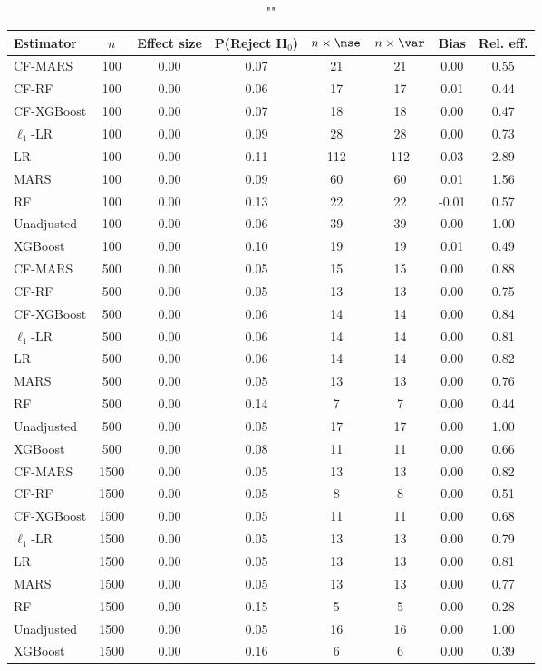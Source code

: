 \begin{table}
\centering
\caption{""}
\begin{tabular}{lccccccc}
\toprule
Estimator & $n$ & Effect size & P(Reject H$_0$) & $n\times\mse$ & $n\times \var$ & Bias & Rel. eff.\\ \midrule
CF-MARS & 100 & 0.00 & 0.07 &  21 &  21 &  0.00 & 0.55 \\ 
CF-RF & 100 & 0.00 & 0.06 &  17 &  17 &  0.01 & 0.44 \\ 
CF-XGBoost & 100 & 0.00 & 0.07 &  18 &  18 &  0.00 & 0.47 \\ 
$\ell_1$-LR & 100 & 0.00 & 0.09 &  28 &  28 &  0.00 & 0.73 \\ 
LR & 100 & 0.00 & 0.11 & 112 & 112 &  0.03 & 2.89 \\ 
MARS & 100 & 0.00 & 0.09 &  60 &  60 &  0.01 & 1.56 \\ 
RF & 100 & 0.00 & 0.13 &  22 &  22 & -0.01 & 0.57 \\ 
Unadjusted & 100 & 0.00 & 0.06 &  39 &  39 &  0.00 & 1.00 \\ 
XGBoost & 100 & 0.00 & 0.10 &  19 &  19 &  0.01 & 0.49 \\ \addlinespace 
CF-MARS & 500 & 0.00 & 0.05 &  15 &  15 &  0.00 & 0.88 \\ 
CF-RF & 500 & 0.00 & 0.05 &  13 &  13 &  0.00 & 0.75 \\ 
CF-XGBoost & 500 & 0.00 & 0.06 &  14 &  14 &  0.00 & 0.84 \\ 
$\ell_1$-LR & 500 & 0.00 & 0.06 &  14 &  14 &  0.00 & 0.81 \\ 
LR & 500 & 0.00 & 0.06 &  14 &  14 &  0.00 & 0.82 \\ 
MARS & 500 & 0.00 & 0.05 &  13 &  13 &  0.00 & 0.76 \\ 
RF & 500 & 0.00 & 0.14 &   7 &   7 &  0.00 & 0.44 \\ 
Unadjusted & 500 & 0.00 & 0.05 &  17 &  17 &  0.00 & 1.00 \\ 
XGBoost & 500 & 0.00 & 0.08 &  11 &  11 &  0.00 & 0.66 \\ \addlinespace 
CF-MARS & 1500 & 0.00 & 0.05 &  13 &  13 &  0.00 & 0.82 \\ 
CF-RF & 1500 & 0.00 & 0.05 &   8 &   8 &  0.00 & 0.51 \\ 
CF-XGBoost & 1500 & 0.00 & 0.05 &  11 &  11 &  0.00 & 0.68 \\ 
$\ell_1$-LR & 1500 & 0.00 & 0.05 &  13 &  13 &  0.00 & 0.79 \\ 
LR & 1500 & 0.00 & 0.05 &  13 &  13 &  0.00 & 0.81 \\ 
MARS & 1500 & 0.00 & 0.05 &  13 &  13 &  0.00 & 0.77 \\ 
RF & 1500 & 0.00 & 0.15 &   5 &   5 &  0.00 & 0.28 \\ 
Unadjusted & 1500 & 0.00 & 0.05 &  16 &  16 &  0.00 & 1.00 \\ 
XGBoost & 1500 & 0.00 & 0.16 &   6 &   6 &  0.00 & 0.39 \\
\bottomrule
\end{tabular}
\end{table}


